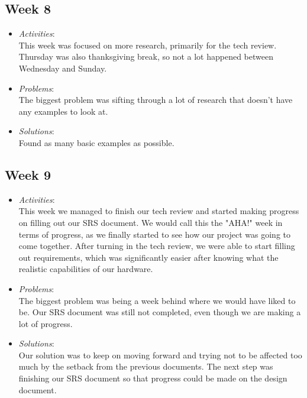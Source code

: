 \documentclass[compsoc,draftclsnofoot,onecolumn,10pt]{IEEEtran}
\begin{document}
\subsection{Week 8}
	\begin{itemize}
        \item \textit{Activities}:\\
        This week was focused on more research, primarily for the tech review. 
        Thursday was also thanksgiving break, so not a lot happened between Wednesday and Sunday. 
        \item \textit{Problems}:\\
        The biggest problem was sifting through a lot of research that doesn't have any examples to look at. 
        \item \textit{Solutions}:\\
        Found as many basic examples as possible.
	\end{itemize}
   
\subsection{Week 9}
	\begin{itemize}
        \item \textit{Activities}:\\
        This week we managed to finish our tech review and started making progress on filling out our SRS document.
        We would call this the "AHA!" week in terms of progress, as we finally started to see how our project was going to come together. 
        After turning in the tech review, we were able to start filling out requirements, which was significantly easier after knowing what the realistic capabilities of our hardware. 
        
        \item \textit{Problems}:\\
        The biggest problem was being a week behind where we would have liked to be. 
        Our SRS document was still not completed, even though we are making a lot of progress. 
       
        \item \textit{Solutions}:\\
        Our solution was to keep on moving forward and trying not to be affected too much by the setback from the previous documents. 
        The next step was finishing our SRS document so that progress could be made on the design document. 
	\end{itemize}
   
\end{document}
